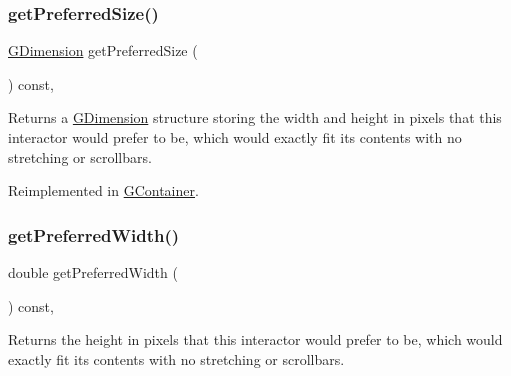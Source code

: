 \mbox{\label{classsgl_1_1GInteractor_a4aabbee761d8e9116275401131b7ccd1}} 
\subsubsection{\texorpdfstring{get\+Preferred\+Size()}{getPreferredSize()}}
{\footnotesize\ttfamily \mbox{\hyperlink{structsgl_1_1GDimension}{G\+Dimension}} get\+Preferred\+Size (\begin{DoxyParamCaption}{ }\end{DoxyParamCaption}) const\hspace{0.3cm}{\ttfamily [virtual]}, {\ttfamily [inherited]}}



Returns a \mbox{\hyperlink{structsgl_1_1GDimension}{G\+Dimension}} structure storing the width and height in pixels that this interactor would prefer to be, which would exactly fit its contents with no stretching or scrollbars. 



Reimplemented in \mbox{\hyperlink{classsgl_1_1GContainer_ac0fd6fc35681f935c67ad68078b354b8}{G\+Container}}.

\mbox{\label{classsgl_1_1GInteractor_a82bca31d37700fb0e35d2743352efd5e}} 
\subsubsection{\texorpdfstring{get\+Preferred\+Width()}{getPreferredWidth()}}
{\footnotesize\ttfamily double get\+Preferred\+Width (\begin{DoxyParamCaption}{ }\end{DoxyParamCaption}) const\hspace{0.3cm}{\ttfamily [virtual]}, {\ttfamily [inherited]}}



Returns the height in pixels that this interactor would prefer to be, which would exactly fit its contents with no stretching or scrollbars. 

\mbox{\label{classsgl_1_1GInteractor_a7b4eec96a2bdc6420695d5796a78eea9}} 
